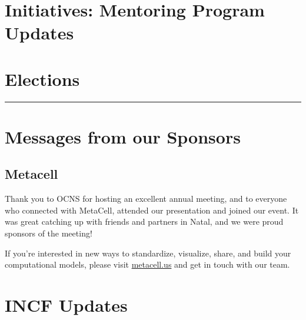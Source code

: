 \documentclass[11pt,a4paper,oneside]{article}
\begin{document}
\newpage
\section*{Initiatives: Mentoring Program Updates}%
\lipsum[1-3]

\newpage
\section*{Elections}%
\rule{\textwidth}{0.4pt}
\lipsum[1-3]

\newpage

\newpage

\newpage
\section*{Messages from our Sponsors}%
\subsection*{Metacell}%
\begin{displayquote}
  Thank you to OCNS for hosting an excellent annual meeting, and to everyone who connected with MetaCell, attended our presentation and joined our event.
  It was great catching up with friends and partners in Natal, and we were proud sponsors of the meeting!

  If you're interested in new ways to standardize, visualize, share, and build your computational models, please visit \url{metacell.us} and get in touch with our team.
\end{displayquote}

\newpage
\section*{INCF Updates}%
\lipsum[1-3]
\end{document}
